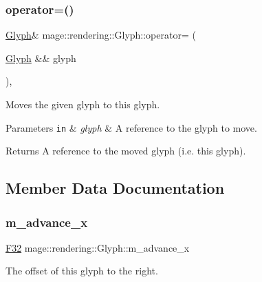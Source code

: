 \subsubsection{\texorpdfstring{operator=()}{operator=()}\hspace{0.1cm}{\footnotesize\ttfamily [2/2]}}
{\footnotesize\ttfamily \mbox{\hyperlink{structmage_1_1rendering_1_1_glyph}{Glyph}}\& mage\+::rendering\+::\+Glyph\+::operator= (\begin{DoxyParamCaption}\item[{\mbox{\hyperlink{structmage_1_1rendering_1_1_glyph}{Glyph}} \&\&}]{glyph }\end{DoxyParamCaption})\hspace{0.3cm}{\ttfamily [default]}, {\ttfamily [noexcept]}}

Moves the given glyph to this glyph.


\begin{DoxyParams}[1]{Parameters}
\mbox{\tt in}  & {\em glyph} & A reference to the glyph to move. \\
\hline
\end{DoxyParams}
\begin{DoxyReturn}{Returns}
A reference to the moved glyph (i.\+e. this glyph). 
\end{DoxyReturn}


\subsection{Member Data Documentation}
\mbox{\label{structmage_1_1rendering_1_1_glyph_ad33e119a54e94db6303a4b5dc0487700}} 
\subsubsection{\texorpdfstring{m\+\_\+advance\+\_\+x}{m\_advance\_x}}
{\footnotesize\ttfamily \mbox{\hyperlink{namespacemage_aa97e833b45f06d60a0a9c4fc22ae02c0}{F32}} mage\+::rendering\+::\+Glyph\+::m\+\_\+advance\+\_\+x}

The offset of this glyph to the right. \mbox{\label{structmage_1_1rendering_1_1_glyph_a9fb2c9297b1d97a58cb499546cf5ddf5}} 
